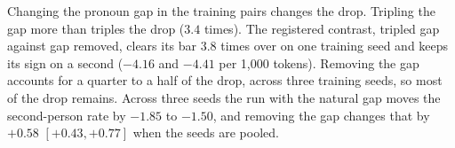 Changing the pronoun gap in the training pairs changes the drop. Tripling the gap more than triples the drop ($3.4$ times). The registered contrast, tripled gap against gap removed, clears its bar $3.8$ times over on one training seed and keeps its sign on a second ($-4.16$ and $-4.41$ per 1,000 tokens). Removing the gap accounts for a quarter to a half of the drop, across three training seeds, so most of the drop remains. Across three seeds the run with the natural gap moves the second-person rate by $-1.85$ to $-1.50$, and removing the gap changes that by $+0.58$ $[+0.43,+0.77]$ when the seeds are pooled.
